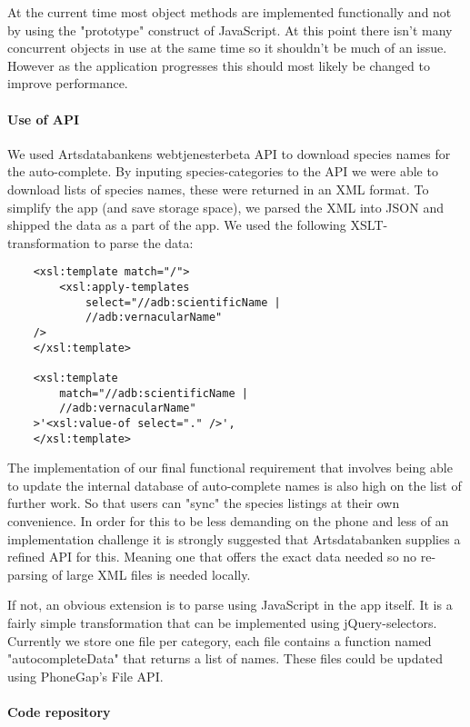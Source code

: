 At the current time most object methods are implemented functionally and not by
using the "prototype" construct of JavaScript.  At this point there isn't many
concurrent objects in use at the same time so it shouldn't be much of an issue.
However as the application progresses this should most likely be changed to
improve performance.

\paragraph{Use of API}\hspace{1mm}\newline

We used Artsdatabankens webtjenesterbeta API to download species names for the
auto-complete. By inputing species-categories to the API we were able to
download lists of species names, these were returned in an XML format. To
simplify the app (and save storage space), we parsed the XML into JSON and
shipped the data as a part of the app. We used the following XSLT-transformation
to parse the data:

\begin{lstlisting}
	<xsl:template match="/">
		<xsl:apply-templates 
			select="//adb:scientificName | 
			//adb:vernacularName" 
	/>
	</xsl:template>

	<xsl:template 
		match="//adb:scientificName | 
		//adb:vernacularName"
	>'<xsl:value-of select="." />',
	</xsl:template>
\end{lstlisting}

The implementation of our final functional requirement that involves being able to update
the internal database of auto-complete names is also high on the list of further work.
So that users can "sync" the species listings at their own convenience.
In order for this to be less demanding on the phone and less of an implementation challenge it is strongly suggested that Artsdatabanken supplies a refined API for this.
Meaning one that offers the exact data needed so no re-parsing of large XML files is needed locally.

If not, an obvious extension is to parse using JavaScript in the app itself. It is a
fairly simple transformation that can be implemented using jQuery-selectors.
Currently we store one file per category, each file contains a function named
"autocompleteData" that returns a list of names.
These files could be updated using PhoneGap's File API.

\paragraph{Code repository}\hspace{1mm}\newline

